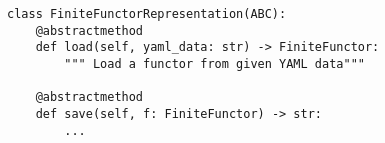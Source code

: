 \par\begin{minipage}{60ex}
\begin{verbatim}
class FiniteFunctorRepresentation(ABC):
    @abstractmethod
    def load(self, yaml_data: str) -> FiniteFunctor:
        """ Load a functor from given YAML data"""

    @abstractmethod
    def save(self, f: FiniteFunctor) -> str:
        ...
\end{verbatim}
\end{minipage}\par